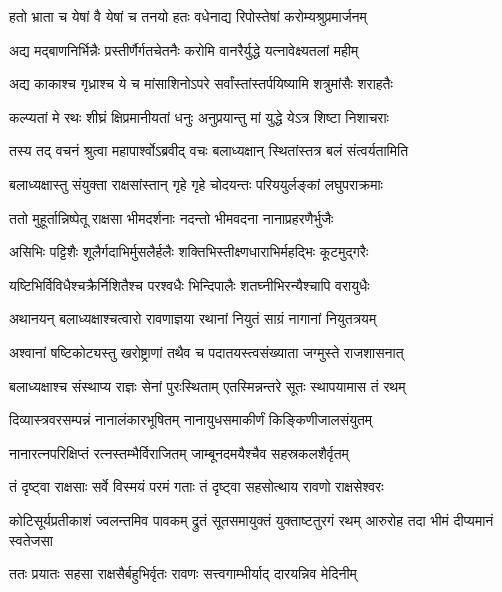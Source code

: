 \twolineshloka
{हतो भ्राता च येषां वै येषां च तनयो हतः}
{वधेनाद्य रिपोस्तेषां करोम्यश्रुप्रमार्जनम्} %

\twolineshloka
{अद्य मद्बाणनिर्भिन्नैः प्रस्तीर्णैर्गतचेतनैः}
{करोमि वानरैर्युद्धे यत्नावेक्ष्यतलां महीम्} %

\twolineshloka
{अद्य काकाश्च गृध्राश्च ये च मांसाशिनोऽपरे}
{सर्वांस्तांस्तर्पयिष्यामि शत्रुमांसैः शराहतैः} %

\twolineshloka
{कल्प्यतां मे रथः शीघ्रं क्षिप्रमानीयतां धनुः}
{अनुप्रयान्तु मां युद्धे येऽत्र शिष्टा निशाचराः} %

\twolineshloka
{तस्य तद् वचनं श्रुत्वा महापार्श्वोऽब्रवीद् वचः}
{बलाध्यक्षान् स्थितांस्तत्र बलं संत्वर्यतामिति} %

\twolineshloka
{बलाध्यक्षास्तु संयुक्ता राक्षसांस्तान् गृहे गृहे}
{चोदयन्तः परिययुर्लङ्कां लघुपराक्रमाः} %

\twolineshloka
{ततो मुहूर्तान्निष्पेतू राक्षसा भीमदर्शनाः}
{नदन्तो भीमवदना नानाप्रहरणैर्भुजैः} %

\twolineshloka
{असिभिः पट्टिशैः शूलैर्गदाभिर्मुसलैर्हलैः}
{शक्तिभिस्तीक्ष्णधाराभिर्महद्भिः कूटमुद्गरैः} %

\twolineshloka
{यष्टिभिर्विविधैश्चक्रैर्निशितैश्च परश्वधैः}
{भिन्दिपालैः शतघ्नीभिरन्यैश्चापि वरायुधैः} %

\twolineshloka
{अथानयन् बलाध्यक्षाश्चत्वारो रावणाज्ञया}
{रथानां नियुतं साग्रं नागानां नियुतत्रयम्} %

\twolineshloka
{अश्वानां षष्टिकोट्यस्तु खरोष्ट्राणां तथैव च}
{पदातयस्त्वसंख्याता जग्मुस्ते राजशासनात्} %

\twolineshloka
{बलाध्यक्षाश्च संस्थाप्य राज्ञः सेनां पुरःस्थिताम्}
{एतस्मिन्नन्तरे सूतः स्थापयामास तं रथम्} %

\twolineshloka
{दिव्यास्त्रवरसम्पन्नं नानालंकारभूषितम्}
{नानायुधसमाकीर्णं किङ्किणीजालसंयुतम्} %

\twolineshloka
{नानारत्नपरिक्षिप्तं रत्नस्तम्भैर्विराजितम्}
{जाम्बूनदमयैश्चैव सहस्रकलशैर्वृतम्} %

\twolineshloka
{तं दृष्ट्वा राक्षसाः सर्वे विस्मयं परमं गताः}
{तं दृष्ट्वा सहसोत्थाय रावणो राक्षसेश्वरः} %

\threelineshloka
{कोटिसूर्यप्रतीकाशं ज्वलन्तमिव पावकम्}
{द्रुतं सूतसमायुक्तं युक्ताष्टतुरगं रथम्}
{आरुरोह तदा भीमं दीप्यमानं स्वतेजसा} %

\twolineshloka
{ततः प्रयातः सहसा राक्षसैर्बहुभिर्वृतः}
{रावणः सत्त्वगाम्भीर्याद् दारयन्निव मेदिनीम्} %

